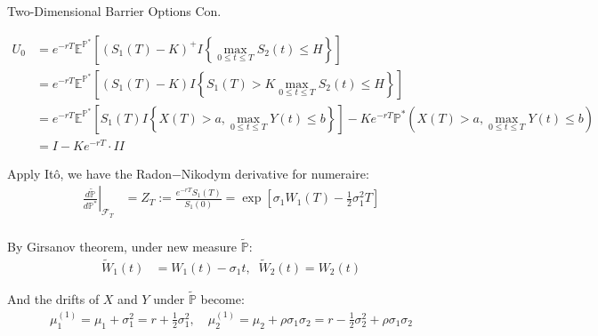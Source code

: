 \documentclass{beamer}
\begin{document}
\begin{frame}{Two-Dimensional Barrier Options Con.}

    {\footnotesize \scriptsize
    \begin{align*}
        U_0 & = e^{-rT} \mathbb{E}^{\mathbb{P}^*}\left[ (S_1(T) - K)^+ 
       I{\left\{ \max_{0 \leq t \leq T} S_2(t) \leq H \right\}} \right]\\
       &= e^{-rT} \mathbb{E}^{\mathbb{P}^*}\left[ (S_1(T) - K) 
       I{\left\{S_1(T) > K \max_{0 \leq t \leq T} S_2(t) \leq H \right\}} \right]\\
       &= e^{-rT} \mathbb{E}^{\mathbb{P}^*}\left[ S_1(T) I{\left\{ X(T) > a, \max\limits_{0 \leq t \leq T} Y(t) \leq b \right\}} \right] 
       - Ke^{-rT} {\mathbb{P}^*}(X(T) > a, \max\limits_{0 \leq t \leq T} Y(t) \leq b)\\
       &= I - Ke^{-rT} \cdot II 
    \end{align*}
    \pause
    \par Apply Itô, we have the Radon$-$Nikodym derivative for numeraire:
    \begin{align*}
        \left.\frac{d\tilde{\mathbb{P}}}{d\mathbb{P}^*}\right|_{\mathcal{F}_T}& = Z_T := \frac{e^{-rT} S_1(T)}{S_1(0)}
         = \exp \left[ \sigma_1W_1(T) - \frac{1}{2}\sigma_1^2 T \right]\\
    \end{align*}
    \par \vspace{-2em}
    \par By Girsanov theorem, under new measure $\tilde{\mathbb{P}}$:
    \begin{align*}
        \tilde{W}_1(t) &= W_1(t) - \sigma_1 t, \;\; \tilde{W}_2(t) = W_2(t)
    \end{align*}
    \par And the drifts of $X$ and $Y$ under $\tilde{\mathbb{P}}$ become:
    \begin{align*}
        \mu_1^{(1)} = \mu_1 + \sigma_1^2 = r + \frac{1}{2}\sigma_1^2, 
        \quad \mu_2^{(1)} = \mu_2 + \rho\sigma_1\sigma_2 = r - \frac{1}{2}\sigma_2^2 + \rho\sigma_1\sigma_2
    \end{align*}
    }
\end{frame}
\end{document}
